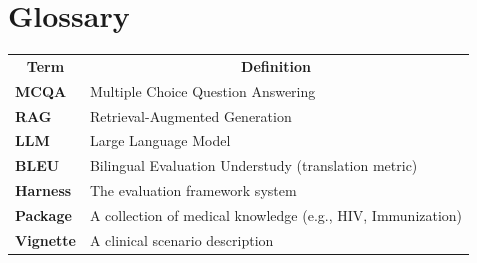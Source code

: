 
\section{Glossary}
 \begin{table}[h!]
\begin{tabular}{ll}
\multicolumn{1}{c}{\textbf{Term}} & \multicolumn{1}{c}{\textbf{Definition}}                     \\
\textbf{MCQA}                     & Multiple Choice Question Answering                          \\
\textbf{RAG}                      & Retrieval-Augmented Generation                              \\
\textbf{LLM}                      & Large Language Model                                        \\
\textbf{BLEU}                     & Bilingual Evaluation Understudy (translation metric)        \\
\textbf{Harness}                  & The evaluation framework system                             \\
\textbf{Package}                  & A collection of medical knowledge (e.g., HIV, Immunization) \\
\textbf{Vignette}                 & A clinical scenario description
\end{tabular}
\end{table}

